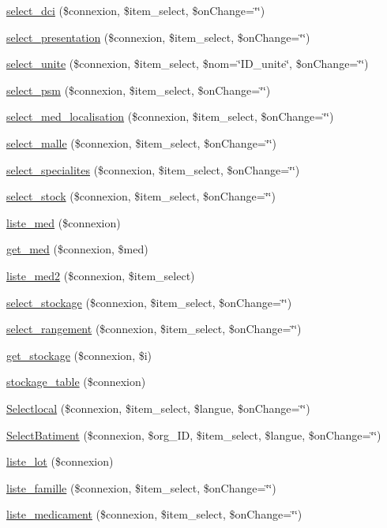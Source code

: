 \begin{CompactItemize}
\item 
\hyperlink{utilitaires__MED_8php_a0}{select\_\-dci} (\$connexion, \$item\_\-select, \$on\-Change=\char`\"{}\char`\"{})
\item 
\hyperlink{utilitaires__MED_8php_a1}{select\_\-presentation} (\$connexion, \$item\_\-select, \$on\-Change=\char`\"{}\char`\"{})
\item 
\hyperlink{utilitaires__MED_8php_a2}{select\_\-unite} (\$connexion, \$item\_\-select, \$nom=\char`\"{}ID\_\-unite\char`\"{}, \$on\-Change=\char`\"{}\char`\"{})
\item 
\hyperlink{utilitaires__MED_8php_a3}{select\_\-psm} (\$connexion, \$item\_\-select, \$on\-Change=\char`\"{}\char`\"{})
\item 
\hyperlink{utilitaires__MED_8php_a4}{select\_\-med\_\-localisation} (\$connexion, \$item\_\-select, \$on\-Change=\char`\"{}\char`\"{})
\item 
\hyperlink{utilitaires__MED_8php_a5}{select\_\-malle} (\$connexion, \$item\_\-select, \$on\-Change=\char`\"{}\char`\"{})
\item 
\hyperlink{utilitaires__MED_8php_a6}{select\_\-specialites} (\$connexion, \$item\_\-select, \$on\-Change=\char`\"{}\char`\"{})
\item 
\hyperlink{utilitaires__MED_8php_a7}{select\_\-stock} (\$connexion, \$item\_\-select, \$on\-Change=\char`\"{}\char`\"{})
\item 
\hyperlink{utilitaires__MED_8php_a8}{liste\_\-med} (\$connexion)
\item 
\hyperlink{utilitaires__MED_8php_a9}{get\_\-med} (\$connexion, \$med)
\item 
\hyperlink{utilitaires__MED_8php_a10}{liste\_\-med2} (\$connexion, \$item\_\-select)
\item 
\hyperlink{utilitaires__MED_8php_a11}{select\_\-stockage} (\$connexion, \$item\_\-select, \$on\-Change=\char`\"{}\char`\"{})
\item 
\hyperlink{utilitaires__MED_8php_a12}{select\_\-rangement} (\$connexion, \$item\_\-select, \$on\-Change=\char`\"{}\char`\"{})
\item 
\hyperlink{utilitaires__MED_8php_a13}{get\_\-stockage} (\$connexion, \$i)
\item 
\hyperlink{utilitaires__MED_8php_a14}{stockage\_\-table} (\$connexion)
\item 
\hyperlink{utilitaires__MED_8php_a15}{Selectlocal} (\$connexion, \$item\_\-select, \$langue, \$on\-Change=\char`\"{}\char`\"{})
\item 
\hyperlink{utilitaires__MED_8php_a16}{Select\-Batiment} (\$connexion, \$org\_\-ID, \$item\_\-select, \$langue, \$on\-Change=\char`\"{}\char`\"{})
\item 
\hyperlink{utilitaires__MED_8php_a17}{liste\_\-lot} (\$connexion)
\item 
\hyperlink{utilitaires__MED_8php_a18}{liste\_\-famille} (\$connexion, \$item\_\-select, \$on\-Change=\char`\"{}\char`\"{})
\item 
\hyperlink{utilitaires__MED_8php_a19}{liste\_\-medicament} (\$connexion, \$item\_\-select, \$on\-Change=\char`\"{}\char`\"{})
\end{CompactItemize}


